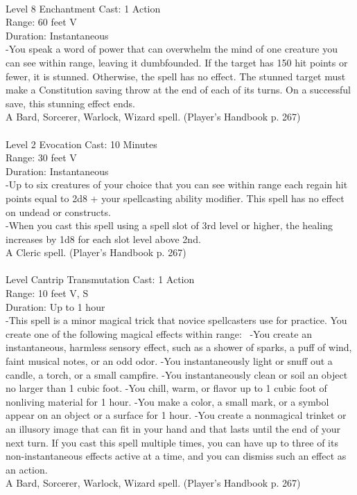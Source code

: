 \documentclass[10pt,twocolumn]{report}
\begin{document}
 \\
Level 8 \quad Enchantment \quad Cast: 1 Action\\
Range: 60 feet \quad V\\
Duration: Instantaneous \quad \\
-You speak a word of power that can overwhelm the mind of one creature you can see within range, leaving it dumbfounded. If the target has 150 hit points or fewer, it is stunned. Otherwise, the spell has no effect. The stunned target must make a Constitution saving throw at the end of each of its turns. On a successful save, this stunning effect ends.\\
A Bard, Sorcerer, Warlock, Wizard spell. (Player's Handbook p. 267) \\


 \\
Level 2 \quad Evocation \quad Cast: 10 Minutes\\
Range: 30 feet \quad V\\
Duration: Instantaneous \quad \\
-Up to six creatures of your choice that you can see within range each regain hit points equal to 2d8 + your spellcasting ability modifier. This spell has no effect on undead or constructs.\\
-When you cast this spell using a spell slot of 3rd level or higher, the healing increases by 1d8 for each slot level above 2nd.\\
A Cleric spell. (Player's Handbook p. 267) \\


 \\
Level Cantrip \quad Transmutation \quad Cast: 1 Action\\
Range: 10 feet \quad V, S\\
Duration: Up to 1 hour \quad \\
-This spell is a minor magical trick that novice spellcasters use for practice. You create one of the following magical effects within range:
 -You create an instantaneous, harmless sensory effect, such as a shower of sparks, a puff of wind, faint musical notes, or an odd odor. 
-You instantaneously light or snuff out a candle, a torch, or a small campfire. 
-You instantaneously clean or soil an object no larger than 1 cubic foot. 
-You chill, warm, or flavor up to 1 cubic foot of nonliving material for 1 hour. 
-You make a color, a small mark, or a symbol appear on an object or a surface for 1 hour. 
-You create a nonmagical trinket or an illusory image that can fit in your hand and that lasts until the end of your next turn. 
If you cast this spell multiple times, you can have up to three of its non-instantaneous effects active at a time, and you can dismiss such an effect as an action.\\
A Bard, Sorcerer, Warlock, Wizard spell. (Player's Handbook p. 267) \\
\end{document}

